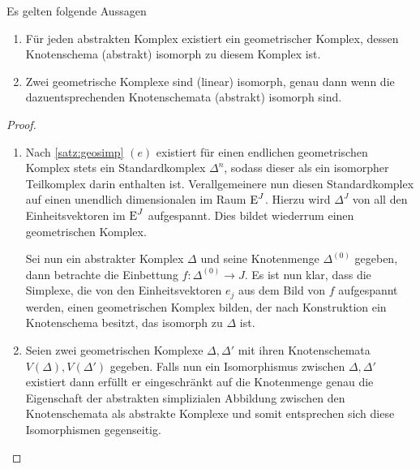 \begin{Satz}
  Es gelten folgende Aussagen
  \begin{enumerate}[(1)]
  \item Für jeden abstrakten Komplex existiert ein geometrischer
    Komplex, dessen Knotenschema (abstrakt) isomorph zu diesem Komplex
    ist.
  \item Zwei geometrische Komplexe sind (linear) isomorph, genau dann
    wenn die dazuentsprechenden Knotenschemata (abstrakt) isomorph
    sind.
  \end{enumerate}
  \begin{proof}
    \begin{enumerate}[(1)]
    \item Nach \cref{satz:geosimp} $(e)$ existiert für einen
      endlichen geometrischen Komplex stets ein Standardkomplex
      $\Delta^n$, sodass dieser als ein isomorpher Teilkomplex darin
      enthalten ist. Verallgemeinere nun diesen Standardkomplex auf
      einen unendlich dimensionalen im Raum $\operatorname{E}^J$. Hierzu wird
      $\Delta^J$ von all den Einheitsvektoren im $\operatorname{E}^J$
      aufgespannt. Dies bildet wiederrum einen geometrischen Komplex.

      Sei nun ein abstrakter Komplex $\Delta$ und seine Knotenmenge
      $\Delta^{(0)}$ gegeben, dann betrachte die Einbettung
      $f : \Delta^{(0)} \rightarrow J$.  Es ist nun klar, dass die
      Simplexe, die von den Einheitsvektoren $e_j$ aus dem Bild von
      $f$ aufgespannt werden, einen geometrischen Komplex bilden, der
      nach Konstruktion ein Knotenschema besitzt, das isomorph zu
      $\Delta$ ist.

    \item Seien zwei geometrischen Komplexe $\Delta,\Delta'$ mit ihren
      Knotenschemata $V(\Delta),V(\Delta')$ gegeben. Falls nun ein
      Isomorphismus zwischen $\Delta,\Delta'$ existiert dann erfüllt
      er eingeschränkt auf die Knotenmenge genau die Eigenschaft der
      abstrakten simplizialen Abbildung zwischen den Knotenschemata
      als abstrakte Komplexe und somit entsprechen sich diese
      Isomorphismen gegenseitig.
    \end{enumerate}
  \end{proof}
\end{Satz}




